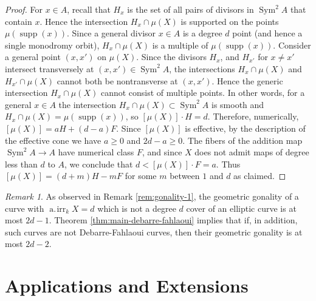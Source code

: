 \documentclass[11pt]{amsart}
\DeclareMathOperator{\supp}{supp}
\DeclareMathOperator{\Sym}{Sym}
\newcommand{\airr}{\operatorname{a.\!irr}}
\theoremstyle{definition}
\theoremstyle{remark}
\newtheorem{remark}[theorem]{Remark}
\begin{document}
\begin{proof}
For $x \in A$, recall that \(H_x\) is the set of all pairs of divisors in \(\Sym^2A\) that contain \(x\).  Hence
 the intersection $H_x \cap \mu(X)$ is supported on the points \(\mu(\supp(x))\).
 Since a general divisor \(x \in A\) is a degree \(d\) point (and hence a single monodromy orbit), $H_x \cap \mu(X)$ is a multiple of \(\mu(\supp(x))\). Consider a general point \((x, x')\) on \(\mu(X)\).
 Since the divisors $H_x$, and $H_{x'}$ for \(x \neq x'\) intersect transversely at $(x,x') \in \Sym^2 A$, the intersections \(H_x \cap \mu(X)\) and \(H_{x'} \cap \mu(X)\) cannot both be nontransverse at \((x, x')\).
 Hence the generic intersection $H_x \cap \mu(X)$ cannot consist of multiple points.  In other words, for a general $x \in A$ the intersection $H_x \cap \mu(X) \subset \Sym^2 A$ is smooth and \(H_x \cap \mu(X) = \mu(\supp(x))\), so $[\mu(X)]\cdot H=d$. Therefore, numerically, $[\mu(X)]=aH+(d-a)F$. Since $[\mu(X)]$ is effective, by the description of the effective cone we have $a \geqslant 0$ and $2d-a \geqslant 0$. The fibers of the addition map $\Sym^2 A \to A$ have numerical class $F$, and since $X$ does not admit maps of degree less than $d$ to $A$, we conclude that $d<[\mu(X)]\cdot F=a$. Thus $[\mu(X)]=(d+m)H-mF$ for some $m$ between $1$ and $d$ as claimed.
\end{proof}

\begin{remark}\label{rem:gonality-2}
As observed in Remark \ref{rem:gonality-1}, the geometric gonality of a curve with $\airr_kX=d$ which is not a degree $d$ cover of an elliptic curve is at most $2d-1$. Theorem \ref{thm:main-debarre-fahlaoui} implies that if, in addition, such curves are not Debarre-Fahlaoui curves, then their geometric gonality is at most $2d-2$.
\end{remark}


\section{Applications and Extensions}\label{sec:Applications}
\end{document}

